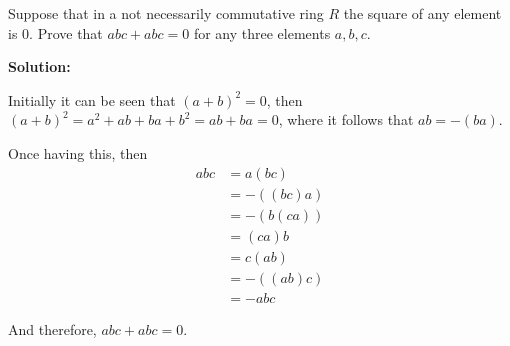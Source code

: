 \documentclass[../../main.tex]{subfiles}
\begin{document}
  \begin{shaded}
    Suppose that in a not necessarily commutative ring $R$ the square of any element is $0$. Prove that $abc + abc = 0$ for any three elements $a, b, c$.
  \end{shaded}

  \textbf{Solution:}

  Initially it can be seen that $(a + b)^2 = 0$, then $(a + b)^2 = a^2 + ab + ba + b^2 = ab + ba = 0$, where it follows that $ab = - (ba)$.

  Once having this, then
  \begin{equation*}
    \begin{split}
      abc & = a (bc) \\ & =
      - ((bc) a) \\ & =
      - (b (ca)) \\ & =
      (ca) b \\ & =
      c (ab) \\ & =
      - ((ab) c) \\ & =
      - abc
    \end{split}
  \end{equation*}

  And therefore, $abc + abc = 0$.
\end{document}
